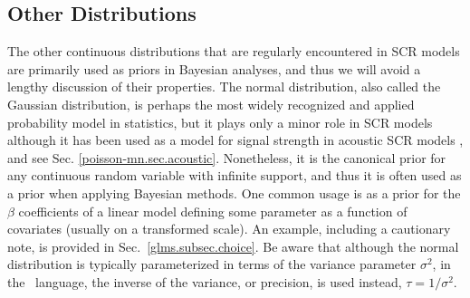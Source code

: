 \subsection{Other Distributions}

The other continuous distributions that are regularly encountered in SCR
models are
primarily used as priors in Bayesian analyses, and thus we will avoid
a lengthy discussion of their properties. %
The normal distribution, also called the Gaussian
distribution, is perhaps the most widely recognized and applied probability model in
statistics, but it plays only a minor role in SCR models although it
has been used as a model for signal strength in acoustic SCR models
\citep{efford_etal:2009ecol,dawson_efford:2009}, and see Sec. \ref{poisson-mn.sec.acoustic}. %
Nonetheless, it
is the canonical prior for any continuous random variable with
infinite support, and thus it is often used as a prior when applying Bayesian
methods. One common usage is as a prior for the $\beta$
coefficients of a linear model defining some parameter as a function
of covariates (usually on a transformed scale). An example, including a
cautionary note, is provided in Sec.~\ref{glms.subsec.choice}.
Be aware that although the normal distribution is typically
parameterized in terms of the variance parameter $\sigma^2$, in
the \bugs~language, the inverse of the variance, or precision, is used
instead, $\tau = 1/\sigma^2$.

